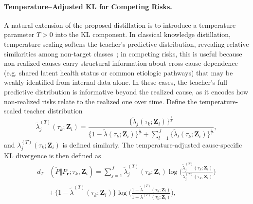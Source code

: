 \documentclass{article}
\theoremstyle{plain}
\theoremstyle{definition}
\theoremstyle{remark}
\begin{document}
\paragraph{Temperature–Adjusted KL for Competing Risks.}
A natural extension of the proposed distillation is to introduce a temperature parameter $T>0$ into the KL  component. In classical knowledge distillation, temperature scaling softens the teacher’s predictive distribution, revealing relative similarities among non-target classes~\citep{hinton2015distilling}; in competing risks, this is useful because non-realized causes carry structural information about cross-cause dependence (e.g. shared latent health status or common etiologic pathways) that may be weakly identified from internal data alone. In these cases, the teacher’s full predictive distribution is informative beyond the realized cause, as it encodes how non-realized risks relate to the realized one over time. 
Define the temperature-scaled teacher distribution
\begin{equation*}
\tilde{\lambda}^{(T)}_j(\tau_k;\bm Z_i)
=
\frac{\{\tilde{\lambda}_j(\tau_k;\bm Z_i)\}^{\frac{1}{T}}}{\big\{1-\tilde{\lambda}(\tau_k;\bm Z_i)\big\}^{\frac{1}{T}}
+ \sum_{l=1}^J \{\tilde{\lambda}_{l}(\tau_k;\bm Z_i)\}^{\frac{1}{T}}},
\end{equation*}
and  $\lambda^{(T)}_j(\tau_k;\bm Z_i)$ is defined similarly. 
The temperature-adjusted cause-specific KL divergence is then defined as
\begin{equation*}
\begin{aligned}
d_T&(\tilde{P}\Vert P_{\boldsymbol r};\tau_k, \bm Z_i)
=
\sum_{j=1}^J 
\tilde{\lambda}^{(T)}_j(\tau_k;\bm Z_i)
\log\!\Biggl(
\frac{\tilde{\lambda}^{(T)}_j(\tau_k;\bm Z_i)}
     {\lambda^{(T)}_j(\tau_k;\bm Z_i)}
\Biggr)\\
&
+ \bigl\{1-\tilde{\lambda}^{(T)}(\tau_k;\bm Z_i)\bigr\}
\log\!\Biggl(
\frac{1-\tilde{\lambda}^{(T)}(\tau_k;\bm Z_i)}
     {1-\lambda^{(T)}(\tau_k;\bm Z_i)}
\Biggr),
\end{aligned}
\end{equation*}
\end{document}
